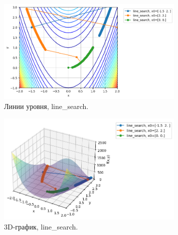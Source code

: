 \documentclass[a4paper,12pt]{article}
\begin{document}
\begin{figure}[H]
    \centering
    \includegraphics[width=0.8\textwidth]{images/task2/plot_levels_2_3_line_search.png}
    \caption{Линии уровня, line\_search.}
\end{figure}
\begin{figure}[H]
    \centering
    \includegraphics[width=0.8\textwidth]{images/task2/plot_3d_2_3_line_search.png}
    \caption{3D-график, line\_search.}
\end{figure}
\end{document}
